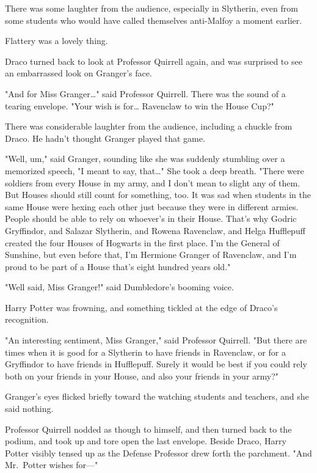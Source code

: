 There was some laughter from the audience, especially in Slytherin, even from 
some students who would have called themselves anti-Malfoy a moment earlier.

Flattery was a lovely thing.

Draco turned back to look at Professor Quirrell again, and was surprised to see 
an embarrassed look on Granger's face.

"And for Miss Granger{\ldots}" said Professor Quirrell. There was the sound of 
a tearing envelope. "Your wish is for{\ldots} Ravenclaw to win the House Cup?"

There was considerable laughter from the audience, including a chuckle from 
Draco. He hadn't thought Granger played that game.

"Well, um," said Granger, sounding like she was suddenly stumbling over a 
memorized speech, "I meant to say, that{\ldots}" She took a deep breath. "There 
were soldiers from every House in my army, and I don't mean to slight any of 
them. But Houses should still count for something, too. It was sad when 
students in the same House were hexing each other just because they were in 
different armies. People should be able to rely on whoever's in their House. 
That's why Godric Gryffindor, and Salazar Slytherin, and Rowena Ravenclaw, and 
Helga Hufflepuff created the four Houses of Hogwarts in the first place. I'm 
the General of Sunshine, but even before that, I'm Hermione Granger of 
Ravenclaw, and I'm proud to be part of a House that's eight hundred years old."

"Well said, Miss Granger!" said Dumbledore's booming voice.

Harry Potter was frowning, and something tickled at the edge of Draco's 
recognition.

"An interesting sentiment, Miss Granger," said Professor Quirrell. "But there 
are times when it is good for a Slytherin to have friends in Ravenclaw, or for 
a Gryffindor to have friends in Hufflepuff. Surely it would be best if you 
could rely both on your friends in your House, and also your friends in your 
army?"

Granger's eyes flicked briefly toward the watching students and teachers, and 
she said nothing.

Professor Quirrell nodded as though to himself, and then turned back to the 
podium, and took up and tore open the last envelope. Beside Draco, Harry Potter 
visibly tensed up as the Defense Professor drew forth the parchment. "And 
Mr.~Potter wishes for---"

